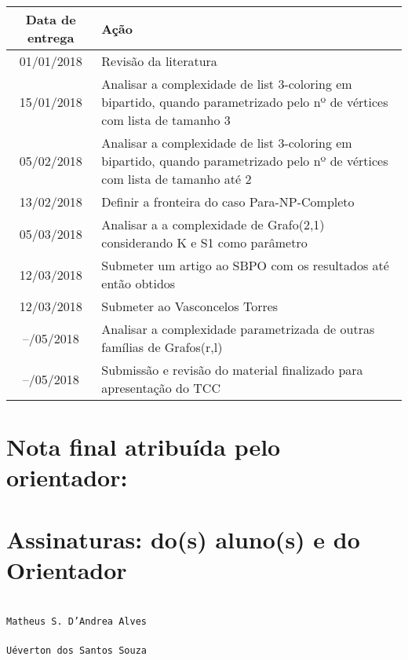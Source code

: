 \documentclass{article}
\begin{document}
\begin{tabular}{|c|p{11cm}|}
    \hline
    Data de entrega &  Ação \\ \hline
    01/01/2018 & Revisão da literatura \\ \hline
    15/01/2018 & Analisar a complexidade de list 3-coloring em bipartido, quando parametrizado pelo nº de vértices com lista de tamanho 3 \\ \hline
    05/02/2018 & Analisar a complexidade de list 3-coloring em bipartido, quando parametrizado pelo nº de vértices com lista de tamanho até 2 \\ \hline
    13/02/2018 & Definir a fronteira do caso Para-NP-Completo \\ \hline
    05/03/2018 & Analisar a a complexidade de Grafo(2,1) considerando K e S1 como parâmetro \\ \hline
    12/03/2018 & Submeter um artigo ao SBPO com os resultados até então obtidos \\ \hline
    12/03/2018 & Submeter ao Vasconcelos Torres \\ \hline
    --/05/2018 & Analisar a complexidade parametrizada de outras famílias de Grafos(r,l) \\ \hline
    --/05/2018 & Submissão e revisão do material finalizado para apresentação do TCC \\ \hline
\end{tabular}

\section{Nota final atribuída pelo orientador: \underline{\hspace{3cm}}}

\section{Assinaturas: do(s) aluno(s) e do Orientador}


\begin{center}
    \vspace{1cm}
    \underline{\hspace{10cm}} \\
    \texttt{Matheus S. D'Andrea Alves}
    \\
    \vspace{1cm}
    \underline{\hspace{10cm}} \\
    \texttt{Uéverton dos Santos Souza}
    
\end{center}
\end{document}
